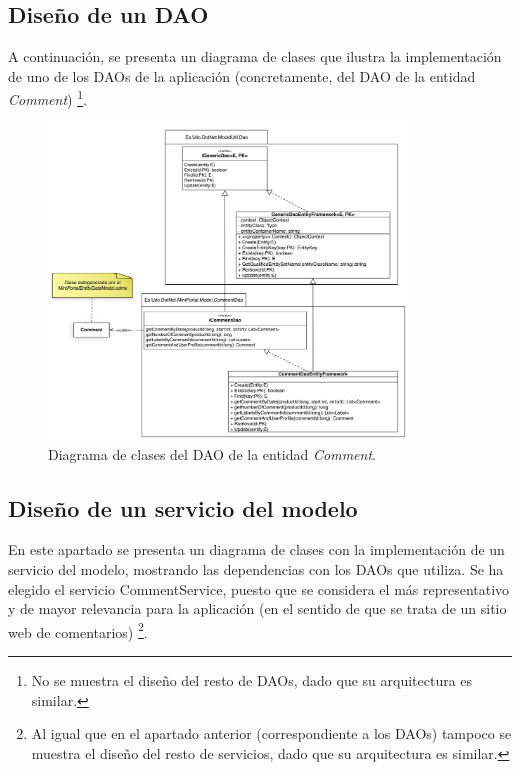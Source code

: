 \documentclass{article}
\begin{document}
\subsection{Diseño de un DAO}

	A continuación, se presenta un diagrama de clases que ilustra la implementación de uno de los DAOs de la aplicación (concretamente, del DAO de la entidad \emph{Comment}) \footnote{No se muestra el diseño del resto de DAOs, dado que su arquitectura es similar.}.
	
\begin{figure}[h]
  \centering
    \includegraphics[width=0.85\textwidth]{img/CommentDao.pdf}
  \caption{Diagrama de clases del DAO de la entidad \emph{Comment}.}
  \label{fig:CommentDao}
\end{figure}	

\subsection{Diseño de un servicio del modelo}


	En este apartado se presenta un diagrama de clases con la implementación de un servicio del modelo, mostrando las dependencias con los DAOs que utiliza. Se ha elegido el servicio CommentService, puesto que se considera el más representativo y de mayor relevancia para la aplicación (en el sentido de que se trata de un sitio web de comentarios) \footnote{Al igual que en el apartado anterior (correspondiente a los DAOs) tampoco se muestra el diseño del resto de servicios, dado que su arquitectura es similar.}.
\end{document}
